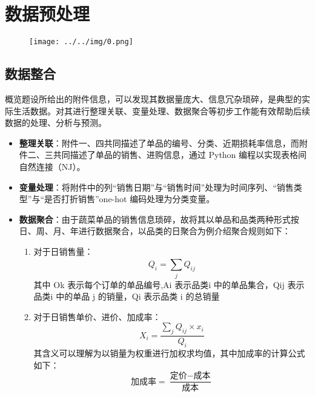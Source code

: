 \documentclass[withoutpreface,bwprint]{cumcmthesis} %
\begin{document}
\section{数据预处理}

\begin{figure}[H]
	\small
	\centering
	\texttt{[image: ../../img/0.png]}
\end{figure}

\subsection{数据整合}

概览题设所给出的附件信息，可以发现其数据量庞大、信息冗杂琐碎，是典型的实际生活数据。对其进行整理关联、变量处理、数据聚合等初步工作能有效帮助后续数据的处理、分析与预测。

\begin{itemize}
    \item \textbf{整理关联}：附件一、四共同描述了单品的编号、分类、近期损耗率信息，而附件二、三共同描述了单品的销售、进购信息，通过 Python 编程以实现表格间自然连接（NJ）。
    \item \textbf{变量处理}：将附件中的列“销售日期”与“销售时间”处理为时间序列、“销售类型”与“是否打折销售”one-hot 编码处理为分类变量。
    \item \textbf{数据聚合}：由于蔬菜单品的销售信息琐碎，故将其以单品和品类两种形式按日、周、月、年进行数据聚合，以品类的日聚合为例介绍聚合规则如下：
    \begin{enumerate}[label=(\alph*)]
		\item 对于日销售量：
		\begin{equation}
			Q_i=\sum_j^{}{Q_{ij}}
		\end{equation}
		其中 Ok 表示每个订单的单品编号,Ai 表示品类i 中的单品集合，Qij 表示品类i 中的单品 j 的销量，Qi 表示品类 i 的总销量
		\item 对于日销售单价、进价、加成率：
		\begin{equation}
			X_i=\frac{\sum_j^{}{Q_{ij}\times x_i}}{Q_i}
		\end{equation}
		其含义可以理解为以销量为权重进行加权求均值，其中加成率的计算公式如下：
		\begin{equation}
			\text{加成率}=\frac{\text{定价}-\text{成本}}{\text{成本}}
		\end{equation}

	\end{enumerate}


\end{itemize}
\end{document}
